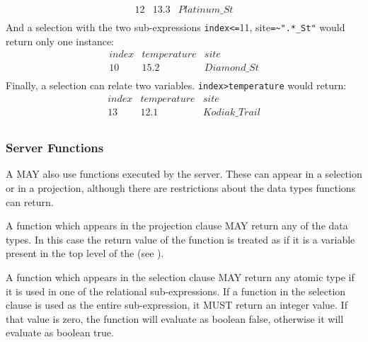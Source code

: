 \documentclass[justify]{nasa-ese}
\begin{document}
\begin{description}
\begin{displaymath}
\begin{array}{ccc}
        12 & 13.3 & Platinum\_St \\
      \end{array}
    \end{displaymath}
    And a selection with the two sub-expressions \verb+index<=+11, 
    site\verb+=~".*_St"+ would return only one instance:
    \begin{displaymath}
      \begin{array}{ccc}
        index & temperature & site \\
        10 & 15.2 & Diamond\_St \\
      \end{array}
    \end{displaymath}
    Finally, a selection can relate two variables.
    \verb+index>temperature+ would return:
    \begin{displaymath}
      \begin{array}{ccc}
        index & temperature & site \\
        13 & 12.1 & Kodiak\_Trail \\
      \end{array}
    \end{displaymath}

\end{description}

\subsubsection{Server Functions}
\label{sec-ce-functions}

A \CE MAY also use functions executed by the server. These can appear in a
selection or in a projection, although there are restrictions about the data
types functions can return. 


A function which appears in the projection clause MAY return any of the \DAP
data types. In this case the return value of the function is treated as if it
is a variable present in the top level of the \Dataset (see
). 

A function which appears in the selection clause MAY return any atomic type
if it is used in one of the relational sub-expressions. If a function in the
selection clause is used as the entire sub-expression, it MUST return an
integer value. If that value is zero, the function will evaluate as boolean
false, otherwise it will evaluate as boolean true.
\end{document}

